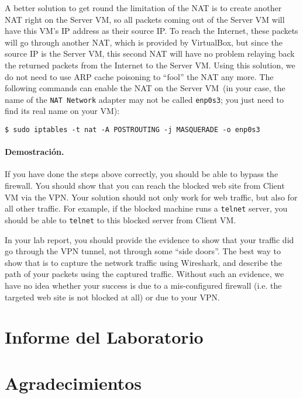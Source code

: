 A better solution to get round the limitation of the NAT is to create another NAT
right on the Server VM, so all packets coming out of the Server VM will have this VM's IP address as their source IP.
To reach the Internet, these packets will go through another NAT, which is provided by
VirtualBox, but since the source IP is the Server VM, this second NAT will have no problem relaying back
the returned packets from the Internet to the Server VM. Using this solution, we do not need to use ARP
cache poisoning to ``fool'' the NAT any more. The following commands can enable the NAT on
the Server VM~(in your case, the name of the \texttt{NAT Network} adapter may not be called 
\texttt{enp0s3}; you just need to find its real name on your VM):

    
\begin{lstlisting}
$ sudo iptables -t nat -A POSTROUTING -j MASQUERADE -o enp0s3
\end{lstlisting}
    


\paragraph{Demostración.}
If you have done the steps above correctly, you should be able to bypass
the firewall. You should show that you can reach the blocked web site from Client VM
via the VPN.  Your solution should
not only work for web traffic, but also for all other traffic. For example, if the blocked
machine runs a \texttt{telnet} server, you should be able to \texttt{telnet} to this blocked server from
Client VM. 

In your lab report, you should provide the evidence to show that your traffic did go through
the VPN tunnel, not through some ``side doors''. The best way to show that is to capture the
network traffic using Wireshark, and describe the path of your packets using the captured
traffic. Without such an evidence, we have no idea whether your success is due to a
mis-configured firewall (i.e. the targeted web site is not blocked at all) or due to your VPN.



\section{Informe del Laboratorio}



\section*{Agradecimientos}






